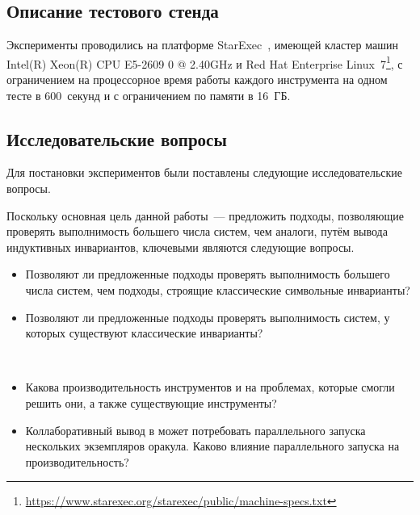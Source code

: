 \subsection{Описание тестового стенда}
Эксперименты проводились на платформе StarExec~\cite{stump2014starexec}, имеющей кластер машин Intel(R) Xeon(R) CPU E5-2609 0 @ 2.40GHz и Red Hat Enterprise Linux~7\footnote{\url{https://www.starexec.org/starexec/public/machine-specs.txt}}, с ограничением на процессорное время работы каждого инструмента на одном тесте в 600~секунд и с ограничением по памяти в 16~ГБ.

\subsection{Исследовательские вопросы}

Для постановки экспериментов были поставлены следующие исследовательские вопросы.

\begin{resquest}\label{rq:conv}
Поскольку основная цель данной работы~--- предложить подходы, позволяющие проверять выполнимость б\textit{о}льшего числа систем, чем аналоги, путём вывода индуктивных инвариантов, ключевыми являются следующие вопросы.
\begin{itemize}
    \item Позволяют ли предложенные подходы проверять выполнимость б\textit{о}льшего числа систем, чем подходы, строящие классические символьные инварианты?
    \item Позволяют ли предложенные подходы проверять выполнимость систем, у которых существуют классические инварианты?
\end{itemize}
\end{resquest}

\begin{resquest}[Производительность]\label{rq:perf}
$ $

\begin{itemize}
    \item Какова производительность инструментов \theringen{} и \ringenSync{} на проблемах, которые смогли решить они, а также существующие инструменты?
    \item Коллаборативный вывод в \theringenCICI{} может потребовать параллельного запуска нескольких экземпляров оракула. Каково влияние параллельного запуска на производительность?
\end{itemize}
\end{resquest}

